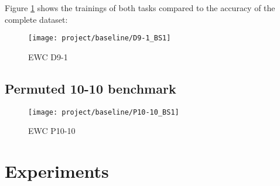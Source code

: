 Figure \ref{fig:ewc_d9-1} shows the trainings of both tasks compared to the accuracy of the complete dataset:

\begin{figure}[H]
    \centering
    \texttt{[image: project/baseline/D9-1\_BS1]}
    \caption{EWC D9-1}
    \label{fig:ewc_d9-1}
\end{figure}

\subsection*{Permuted 10-10 benchmark}



\begin{figure}[H]
    \centering
    \texttt{[image: project/baseline/P10-10\_BS1]}
    \caption{EWC P10-10}
    \label{fig:ewc_p10-10}
\end{figure}

\section{Experiments}

